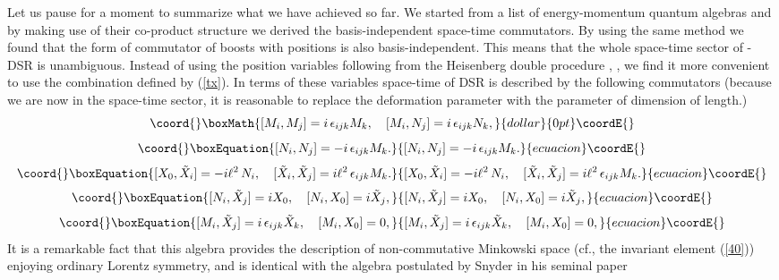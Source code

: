 \documentclass [prd,twocolumn,nofootinbib,showpacs]  {revtex4}
\begin{document}
Let us pause for a moment to summarize what we have achieved so
far. We started from a list of  energy-momentum quantum algebras
and by making use of their co-product structure we derived the
basis-independent space-time commutators.  By using the same
method we found that the form of commutator of boosts with
positions is also basis-independent. This means that the whole
space-time sector of \myHighlight{$\kappa$}\coordHE{}-DSR is unambiguous. Instead of using
the \coordHE{} position variables following from the Heisenberg double
procedure \cite{luno}, \cite{lukps}, we find it more convenient to
use the combination \coordHE{} defined by (\ref{tx}). In terms
of these variables space-time of DSR is described by the following
commutators (because we are now in the space-time sector, it is
reasonable to replace the deformation parameter \myHighlight{$\kappa$}\coordHE{} with the
parameter \myHighlight{$\ell$}\coordHE{} of dimension of length.)
$$\coord{}\boxMath{
[M_i, M_j] = i\, \epsilon_{ijk} M_k, \quad [M_i, N_j] = i\, \epsilon_{ijk} N_k,
}{dollar}{0pt}\coordE{}$$
\begin{equation}\coord{}\boxEquation{\label{41}
  [N_i, N_j] = -i\, \epsilon_{ijk} M_k.
}{[N_i, N_j] = -i\, \epsilon_{ijk} M_k.
}{ecuacion}\coordE{}\end{equation}
\begin{equation}\coord{}\boxEquation{\label{42}
 [X_0, \tilde{X}_i] = - i\ell^2 \, N_i, \quad [\tilde{X}_i, \tilde{X}_j] =  i\ell^2 \,\epsilon_{ijk} M_k.
}{[X_0, \tilde{X}_i] = - i\ell^2 \, N_i, \quad [\tilde{X}_i, \tilde{X}_j] =  i\ell^2 \,\epsilon_{ijk} M_k.
}{ecuacion}\coordE{}\end{equation}
\begin{equation}\coord{}\boxEquation{\label{43}
[N_i, \tilde{X}_j] = i X_0, \quad [N_i, X_0]= i \tilde{X}_j,
}{[N_i, \tilde{X}_j] = i X_0, \quad [N_i, X_0]= i \tilde{X}_j,
}{ecuacion}\coordE{}\end{equation}
\begin{equation}\coord{}\boxEquation{\label{43a}
[M_i, \tilde{X}_j] = i\, \epsilon_{ijk} \tilde{X}_k , \quad [M_i, X_0]= 0,
}{[M_i, \tilde{X}_j] = i\, \epsilon_{ijk} \tilde{X}_k , \quad [M_i, X_0]= 0,
}{ecuacion}\coordE{}\end{equation}
It is a remarkable fact that this algebra provides the description
of non-commutative Minkowski space  (cf., the invariant element
(\ref{40})) enjoying ordinary Lorentz symmetry, and is identical
with the algebra postulated by Snyder in his seminal paper
\end{document}
